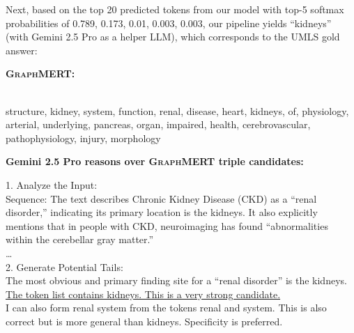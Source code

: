 \documentclass[10pt]{article}
\newcommand{\ours}{\textsc{GraphMERT}\xspace}
\begin{document}
Next, based on the top 20 predicted tokens from our model with top-5 softmax probabilities of 0.789, 0.173, 0.01, 0.003, 0.003, our pipeline yields ``kidneys'' (with Gemini 2.5 Pro as a helper LLM), which corresponds to the UMLS gold answer:
\begin{tcolorbox}[enhanced,breakable,colback=gray!5,colframe=gray!40,
                  left=6pt,right=6pt,top=6pt,bottom=6pt,boxsep=0pt]
\noindent\textbf{\ours:}{\small\\
structure, kidney, system, function, renal, disease, heart, kidneys, of, physiology, arterial, underlying, pancreas, organ, impaired, health, cerebrovascular, pathophysiology, injury, morphology

\vspace{\baselineskip}
\textbf{Gemini 2.5 Pro reasons over \ours triple candidates:} 

1. Analyze the Input:\\
Sequence: The text describes Chronic Kidney Disease (CKD) as a ``renal disorder,'' indicating its primary location is the kidneys. It also explicitly mentions that in people with CKD, neuroimaging has found ``abnormalities within the cerebellar gray matter.''\\
\ldots\\
2. Generate Potential Tails:\\
The most obvious and primary finding site for a ``renal disorder'' is the kidneys. \underline{The token list contains kidneys. This is a very strong candidate.}\\

I can also form renal system from the tokens renal and system. This is also correct but is more general than kidneys. Specificity is preferred.\\

}
\end{tcolorbox}
\end{document}
